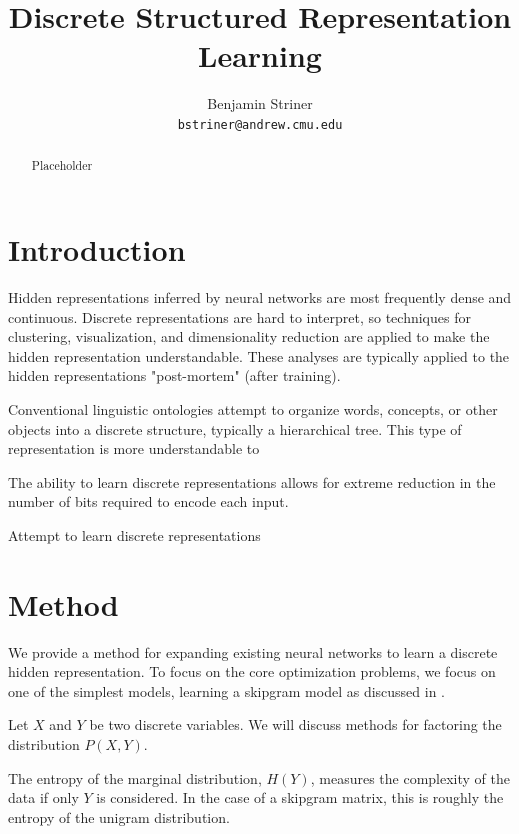 \documentclass[11pt,letterpaper]{article}
\title{Discrete Structured Representation Learning}
\author{Benjamin Striner \\
  {\tt bstriner@andrew.cmu.edu} \\}
\date{}
\begin{document}
\maketitle
\begin{abstract}
  Placeholder
\end{abstract}

\setlength{\thinmuskip}{0mu}
\setlength{\medmuskip}{0mu}
\setlength{\thickmuskip}{0mu} 


\section{Introduction}

Hidden representations inferred by neural networks are most frequently dense and continuous. Discrete representations are hard to interpret, so techniques for clustering, visualization, and dimensionality reduction are applied to make the hidden representation understandable. These analyses are typically applied to the hidden representations "post-mortem" (after training).

Conventional linguistic ontologies attempt to organize words, concepts, or other objects into a discrete structure, typically a hierarchical tree. This type of representation is more understandable to 

The ability to learn discrete representations allows for extreme reduction in the number of bits required to encode each input.

Attempt to learn discrete representations \cite{Hu17}

\section{Method}

We provide a method for expanding existing neural networks to learn a discrete hidden representation. To focus on the core optimization problems, we focus on one of the simplest models, learning a skipgram model as discussed in \cite{Mikolov1301} \cite{MikolovSCCD13}.

Let $X$ and $Y$ be two discrete variables. We will discuss methods for factoring the distribution $P(X,Y)$.



The entropy of the marginal distribution, $H(Y)$, measures the complexity of the data if only $Y$ is considered. In the case of a skipgram matrix, this is roughly the entropy of the unigram distribution.
\end{document}

